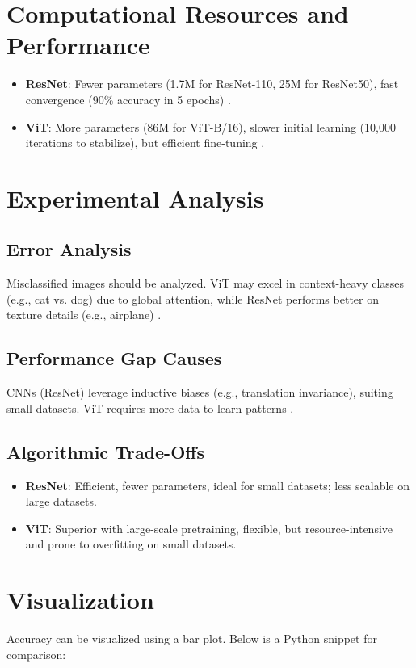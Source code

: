 \documentclass[UTF8]{report}
\theoremstyle{MyLineTheoremStyle} %
\theoremstyle{MyBlockTheoremStyle} %
\theoremstyle{MySubsubsectionStyle} %
\begin{document}
\section*{Computational Resources and Performance}
\begin{itemize}
    \item \textbf{ResNet}: Fewer parameters (1.7M for ResNet-110, 25M for ResNet50), fast convergence (90\% accuracy in 5 epochs) \cite{pytorchforum}.
    \item \textbf{ViT}: More parameters (86M for ViT-B/16), slower initial learning (10,000 iterations to stabilize), but efficient fine-tuning \cite{lightningvit, dosovitskiy2020image}.
\end{itemize}

\section*{Experimental Analysis}
\subsection*{Error Analysis}
Misclassified images should be analyzed. ViT may excel in context-heavy classes (e.g., cat vs. dog) due to global attention, while ResNet performs better on texture details (e.g., airplane) \cite{kentaroy47vit}.

\subsection*{Performance Gap Causes}
CNNs (ResNet) leverage inductive biases (e.g., translation invariance), suiting small datasets. ViT requires more data to learn patterns \cite{lightningvit}.

\subsection*{Algorithmic Trade-Offs}
\begin{itemize}
    \item \textbf{ResNet}: Efficient, fewer parameters, ideal for small datasets; less scalable on large datasets.
    \item \textbf{ViT}: Superior with large-scale pretraining, flexible, but resource-intensive and prone to overfitting on small datasets.
\end{itemize}

\section*{Visualization}
Accuracy can be visualized using a bar plot. Below is a Python snippet for comparison:
\end{document}
